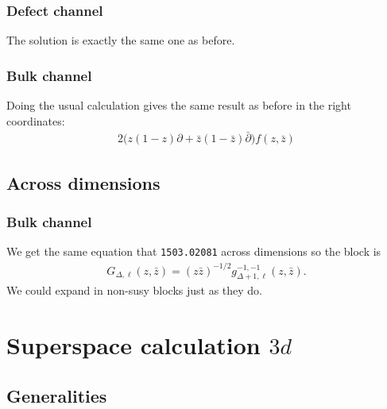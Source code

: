 \documentclass[letterpaper]{article}
\let\Oldsection\section
\renewcommand{\section}{\FloatBarrier\Oldsection}
\let\Oldsubsection\subsection
\renewcommand{\subsection}{\FloatBarrier\Oldsubsection}
\let\Oldsubsubsection\subsubsection
\renewcommand{\subsubsection}{\FloatBarrier\Oldsubsubsection}
\newcommand\zb{{\bar z}}
\begin{document}
\subsubsection{Defect channel}

The solution is exactly the same one as before.

\subsubsection{Bulk channel}

Doing the usual calculation gives the same result as before in the right coordinates:
\begin{align}
 2 \Big( z(1-z) \partial + \zb(1-\zb) \bar \partial \Big) f(z, \zb) 
\end{align}

\subsection{Across dimensions}

\subsubsection{Bulk channel}

We get the same equation that \texttt{1503.02081} across dimensions so the block is
\begin{align}
 G_{\Delta,\ell}(z, \zb) 
 = (z \zb)^{-1/2} g_{\Delta+1,\ell}^{-1,-1}(z,\zb).
\end{align}
We could expand in non-susy blocks just as they do.


\section{Superspace calculation \texorpdfstring{$3d$}{3d}}

\subsection{Generalities}
\end{document}
